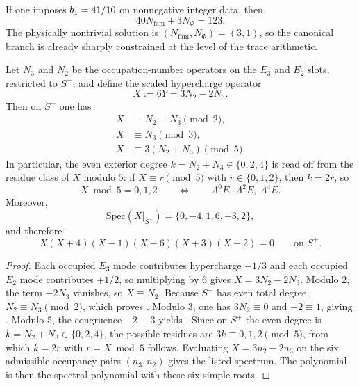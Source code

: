 \begin{remark}
If one imposes $b_1=41/10$ on nonnegative integer data, then
\[
40N_{\mathrm{fam}}+3N_\Phi=123.
\]
The physically nontrivial solution is $(N_{\mathrm{fam}},N_\Phi)=(3,1)$, so the canonical branch is already sharply constrained at the level of the trace arithmetic.
\end{remark}

\begin{proposition}
\label{prop:family-hypercharge-compression}
Let $N_3$ and $N_2$ be the occupation-number operators on the $E_3$ and $E_2$ slots, restricted to $S^+$, and define the scaled hypercharge operator
\[
X:=6Y=3N_2-2N_3.
\]
Then on $S^+$ one has
\begin{align}
X&\equiv N_2\equiv N_3 \pmod 2,\label{eq:x-mod-2}\\
X&\equiv N_3 \pmod 3,\label{eq:x-mod-3}\\
X&\equiv 3(N_2+N_3) \pmod 5.\label{eq:x-mod-5}
\end{align}
In particular, the even exterior degree $k=N_2+N_3\in\{0,2,4\}$ is read off from the residue class of $X$ modulo $5$: if $X\equiv r\pmod 5$ with $r\in\{0,1,2\}$, then $k=2r$, so
\[
X\bmod 5=0,1,2
\qquad\Longleftrightarrow\qquad
\Lambda^0E,\ \Lambda^2E,\ \Lambda^4E.
\]
Moreover,
\[
\mathrm{Spec}(X|_{S^+})=\{0,-4,1,6,-3,2\},
\]
and therefore
\begin{equation}
\label{eq:family-x-polynomial}
X(X+4)(X-1)(X-6)(X+3)(X-2)=0
\qquad\text{on }S^+.
\end{equation}
\end{proposition}

\begin{proof}
Each occupied $E_3$ mode contributes hypercharge $-1/3$ and each occupied $E_2$ mode contributes $+1/2$, so multiplying by $6$ gives $X=3N_2-2N_3$. Modulo $2$, the term $-2N_3$ vanishes, so $X\equiv N_2$. Because $S^+$ has even total degree, $N_2\equiv N_3\pmod 2$, which proves . Modulo $3$, one has $3N_2\equiv 0$ and $-2\equiv 1$, giving . Modulo $5$, the congruence $-2\equiv 3$ yields . Since on $S^+$ the even degree is $k=N_2+N_3\in\{0,2,4\}$, the possible residues are $3k\equiv 0,1,2\pmod 5$, from which $k=2r$ with $r=X\bmod 5$ follows. Evaluating $X=3n_2-2n_3$ on the six admissible occupancy pairs $(n_3,n_2)$ gives the listed spectrum. The polynomial  is then the spectral polynomial with these six simple roots.
\end{proof}

